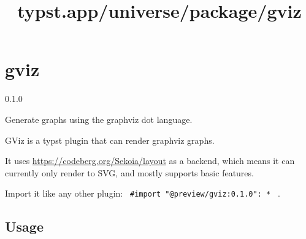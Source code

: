 \title{typst.app/universe/package/gviz}

\label{banner}
\section{gviz}\label{gviz}

{ 0.1.0 }

Generate graphs using the graphviz dot language.

\label{readme}
GViz is a typst plugin that can render graphviz graphs.

It uses \url{https://codeberg.org/Sekoia/layout} as a backend, which
means it can currently only render to SVG, and mostly supports basic
features.

Import it like any other plugin:
\texttt{\ \#import\ "@preview/gviz:0.1.0":\ *\ } .

\subsection{Usage}\label{usage}

\begin{Shaded}
\begin{Highlighting}[]


\NormalTok{\}\textasciigrave{}\textasciigrave{}\textasciigrave{}}


\end{Highlighting}
\end{Shaded}


